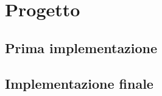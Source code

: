 \documentclass[../../main.tex]{subfiles}
\begin{document}
\section{Progetto}

\subsection{Prima implementazione}

\subsection{Implementazione finale}
\end{document}
